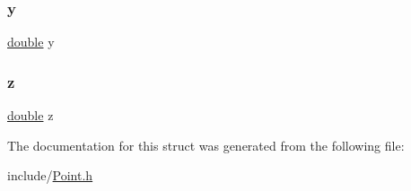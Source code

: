 \subsubsection{\texorpdfstring{y}{y}}
{\footnotesize\ttfamily \hyperlink{g3x__transfo_8h_a89b2b23e407882a535d835574a7912e1}{double} y}

\mbox{\label{struct_point_ab3e6ed577a7c669c19de1f9c1b46c872}} 
\subsubsection{\texorpdfstring{z}{z}}
{\footnotesize\ttfamily \hyperlink{g3x__transfo_8h_a89b2b23e407882a535d835574a7912e1}{double} z}



The documentation for this struct was generated from the following file\+:\begin{DoxyCompactItemize}
\item 
include/\hyperlink{_point_8h}{Point.\+h}\end{DoxyCompactItemize}
